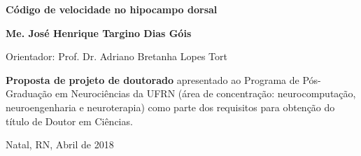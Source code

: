 \begin{titlepage}
\begin{center}
\vfill

\LARGE

\textbf{Código de velocidade no hipocampo dorsal}

\vfill

\Large

\textbf{Me. José Henrique Targino Dias Góis}

\vfill

\normalsize

Orientador: Prof. Dr. Adriano Bretanha Lopes Tort

\vfill

\hfill
\parbox{0.5\linewidth}{\textbf{Proposta de projeto de doutorado} apresentado ao Programa de Pós-Graduação em Neurociências da UFRN (área de concentração: neurocomputação, neuroengenharia e neuroterapia) como parte dos requisitos para obtenção do título de Doutor em Ciências.}

\vfill

\large


Natal, RN, Abril de 2018

\end{center}

\end{titlepage}
